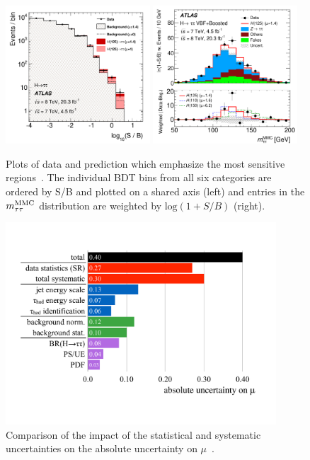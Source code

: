 \begin{figure}[tp]
  \centering
  \includegraphics[width=0.48\textwidth]{figures/HIGG-2013-32/fig_10}
  \includegraphics[width=0.48\textwidth]{figures/HIGG-2013-32/fig_11b}
  \caption{Plots of data and prediction which emphasize the most sensitive regions~\cite{HIGG-2013-32}. The individual BDT bins from all six categories are ordered by S/B and plotted on a shared axis (left) and entries in the $m_{\tau\tau}^\text{MMC}$ distribution are weighted by $\text{log}(1+S/B)$ (right).}
  \label{fig:results-money-plots}
\end{figure}

\begin{figure}[tp]
  \centering
  \includegraphics[width=0.90\textwidth]{figures/HIGG-2013-32/uncertainties}
  \caption{Comparison of the impact of the statistical and systematic uncertainties on the absolute uncertainty on $\mu$~\cite{HIGG-2013-32}.}
  \label{fig:results-uncertainties-1}
\end{figure}

